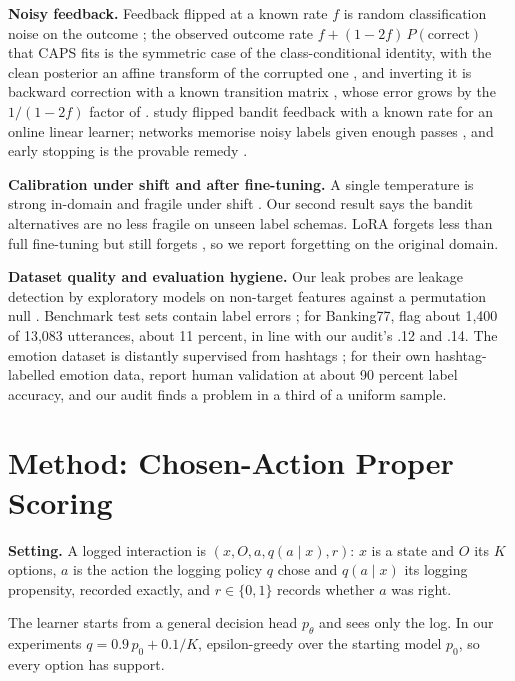 \documentclass[10pt,letterpaper]{article}
\theoremstyle{plain}
\begin{document}
\textbf{Noisy feedback.} Feedback flipped at a known rate $f$ is random classification noise on the outcome \citep{angluin1988noisy}; the observed outcome rate $f + (1-2f)\,P(\mathrm{correct})$ that CAPS fits is the symmetric case of the class-conditional identity, with the clean posterior an affine transform of the corrupted one \citep{natarajan2013noisy,menon2015corrupted}, and inverting it is backward correction with a known transition matrix \citep{patrini2017losscorrection}, whose error grows by the $1/(1-2f)$ factor of \citeauthor{angluin1988noisy}. \citet{agarwal2021noisybandit} study flipped bandit feedback with a known rate for an online linear learner; networks memorise noisy labels given enough passes \citep{zhang2017rethinking}, and early stopping is the provable remedy \citep{li2020earlystopping}.

\textbf{Calibration under shift and after fine-tuning.} A single temperature is strong in-domain and fragile under shift \citep{ovadia2019shift}. Our second result says the bandit alternatives are no less fragile on unseen label schemas. LoRA forgets less than full fine-tuning but still forgets \citep{biderman2024lora}, so we report forgetting on the original domain.

\textbf{Dataset quality and evaluation hygiene.} Our leak probes are leakage detection by exploratory models on non-target features \citep{kaufman2012leakage} against a permutation null \citep{ojala2010permutation}. Benchmark test sets contain label errors \citep{northcutt2021pervasive}; for Banking77, \citet{ying2022banking77errors} flag about 1,400 of 13,083 utterances, about 11 percent, in line with our audit's .12 and .14. The emotion dataset is distantly supervised from hashtags \citep{saravia2018carer}; for their own hashtag-labelled emotion data, \citet{abdulmageed2017emonet} report human validation at about 90 percent label accuracy, and our audit finds a problem in a third of a uniform sample.

\section{Method: Chosen-Action Proper Scoring}\label{sec:3}

\textbf{Setting.} A logged interaction is $(x, O, a, q(a \mid x), r)$: $x$ is a state and $O$ its $K$ options, $a$ is the action the logging policy $q$ chose and $q(a \mid x)$ its logging propensity, recorded exactly, and $r \in \{0, 1\}$ records whether $a$ was right.

The learner starts from a general decision head $p_\theta$ and sees only the log. In our experiments $q = 0.9\, p_0 + 0.1/K$, epsilon-greedy over the starting model $p_0$, so every option has support.
\end{document}
